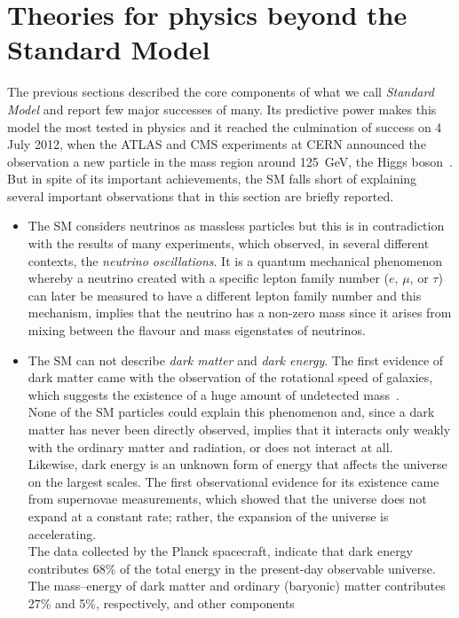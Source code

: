 \section{Theories for physics beyond the Standard Model}
\label{sec:bsm}
The previous sections described the core components of what we call \textit{Standard Model} and report few major successes of many. 
Its predictive power makes this model the most tested in physics and it reached the culmination of success on 4 July 2012, when
the ATLAS and CMS experiments at CERN announced the observation a new particle in the mass region around 125~GeV, the
Higgs boson~\cite{higgsDiscovery}. \\
But in spite of its important achievements, the SM falls short of explaining several important observations that in this section
are briefly reported.
\begin{itemize}
\item The SM considers neutrinos as massless particles but this is in contradiction with the results of many experiments, which observed,
in several different contexts, the \textit{neutrino oscillations}. 
It is a quantum mechanical phenomenon whereby a neutrino created with a specific lepton family number ($e$, $\mu$, or $\tau$) 
can later be measured to have a different lepton family number and this mechanism, implies that the neutrino has a non-zero mass 
since it arises from mixing between the flavour and mass eigenstates of neutrinos. 
\item The SM can not describe \textit{dark matter} and \textit{dark energy}. The first evidence of dark matter came with the observation of 
the rotational speed of galaxies, which suggests the existence of a huge amount of undetected mass~\cite{zwicky}.\\
None of the SM particles could explain this phenomenon and, since a dark matter has never been directly observed, implies that
it interacts only weakly with the ordinary matter and radiation, or does not interact at all.\\
Likewise, dark energy is an unknown form of energy that affects the universe on the largest scales.
The first observational evidence for its existence came from supernovae measurements, which showed that the universe does 
not expand at a constant rate; rather, the expansion of the universe is accelerating.\\
The data collected by the Planck spacecraft, indicate that dark energy contributes  68\% of the total energy in the present-day observable universe. 
The mass–energy of dark matter and ordinary (baryonic) matter contributes 27\% and 5\%, respectively, and other components 

\end{itemize}
